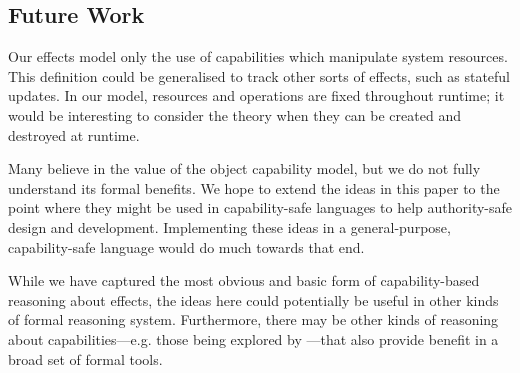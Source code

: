 


\subsection{Future Work}

Our effects model only the use of capabilities which manipulate system resources. This definition could be generalised to track other sorts of effects, such as stateful updates. In our model, resources and operations are fixed throughout runtime; it would be interesting to consider the theory when they can be created and destroyed at runtime.

Many believe in the value of the object capability model, but we do not fully understand its formal benefits. We hope to extend the ideas in this paper to the point where they might be used in capability-safe languages to help authority-safe design and development. Implementing these ideas in a general-purpose, capability-safe language would do much towards that end.

While we have captured the most obvious and basic form of capability-based reasoning about effects, the ideas here could potentially be useful in other kinds of formal reasoning system.
Furthermore, there may be other kinds of reasoning about capabilities---e.g. those being explored by \citet{drossopoulou07}---that also provide benefit in a broad set of formal tools.

